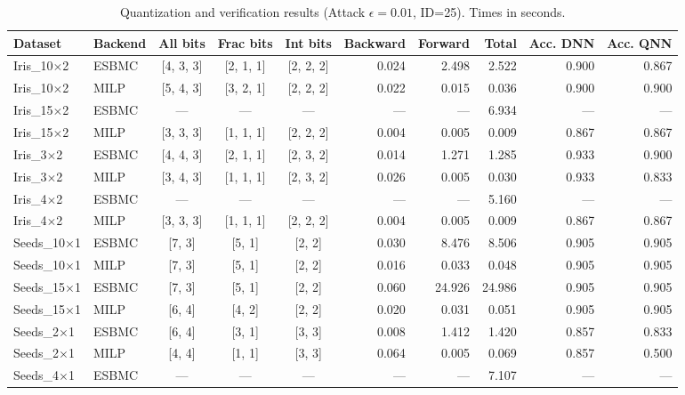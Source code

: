 \begin{table}[htbp]
\centering
\caption{Quantization and verification results (Attack $\epsilon=0.01$, ID=25). Times in seconds.}
\label{tab:results-attack001-id25}
\small
\begin{tabular}{@{}llccc rrr rr@{}}
\hline
Dataset & Backend & All bits & Frac bits & Int bits & Backward & Forward & Total & Acc. DNN & Acc. QNN \\
\hline
Iris\_10$\times$2 & ESBMC & {[4, 3, 3]} & {[2, 1, 1]} & {[2, 2, 2]} & 0.024 & 2.498 & 2.522 & 0.900 & 0.867 \\
Iris\_10$\times$2 & MILP & {[5, 4, 3]} & {[3, 2, 1]} & {[2, 2, 2]} & 0.022 & 0.015 & 0.036 & 0.900 & 0.900 \\
\hline
Iris\_15$\times$2 & ESBMC & --- & --- & --- & --- & --- & 6.934 & --- & --- \\
Iris\_15$\times$2 & MILP & {[3, 3, 3]} & {[1, 1, 1]} & {[2, 2, 2]} & 0.004 & 0.005 & 0.009 & 0.867 & 0.867 \\
\hline
Iris\_3$\times$2 & ESBMC & {[4, 4, 3]} & {[2, 1, 1]} & {[2, 3, 2]} & 0.014 & 1.271 & 1.285 & 0.933 & 0.900 \\
Iris\_3$\times$2 & MILP & {[3, 4, 3]} & {[1, 1, 1]} & {[2, 3, 2]} & 0.026 & 0.005 & 0.030 & 0.933 & 0.833 \\
\hline
Iris\_4$\times$2 & ESBMC & --- & --- & --- & --- & --- & 5.160 & --- & --- \\
Iris\_4$\times$2 & MILP & {[3, 3, 3]} & {[1, 1, 1]} & {[2, 2, 2]} & 0.004 & 0.005 & 0.009 & 0.867 & 0.867 \\
\hline
Seeds\_10$\times$1 & ESBMC & {[7, 3]} & {[5, 1]} & {[2, 2]} & 0.030 & 8.476 & 8.506 & 0.905 & 0.905 \\
Seeds\_10$\times$1 & MILP & {[7, 3]} & {[5, 1]} & {[2, 2]} & 0.016 & 0.033 & 0.048 & 0.905 & 0.905 \\
\hline
Seeds\_15$\times$1 & ESBMC & {[7, 3]} & {[5, 1]} & {[2, 2]} & 0.060 & 24.926 & 24.986 & 0.905 & 0.905 \\
Seeds\_15$\times$1 & MILP & {[6, 4]} & {[4, 2]} & {[2, 2]} & 0.020 & 0.031 & 0.051 & 0.905 & 0.905 \\
\hline
Seeds\_2$\times$1 & ESBMC & {[6, 4]} & {[3, 1]} & {[3, 3]} & 0.008 & 1.412 & 1.420 & 0.857 & 0.833 \\
Seeds\_2$\times$1 & MILP & {[4, 4]} & {[1, 1]} & {[3, 3]} & 0.064 & 0.005 & 0.069 & 0.857 & 0.500 \\
\hline
Seeds\_4$\times$1 & ESBMC & --- & --- & --- & --- & --- & 7.107 & --- & --- \\

\end{tabular}
\end{table}
